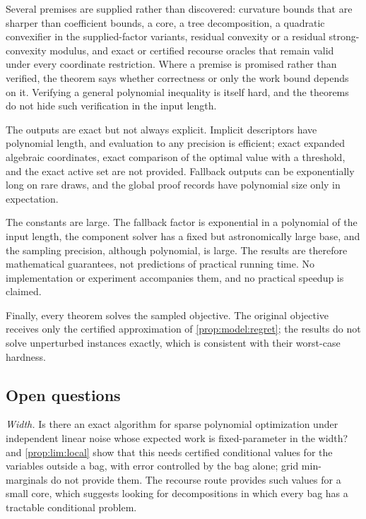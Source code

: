 Several premises are supplied rather than discovered: curvature bounds that
are sharper than coefficient bounds, a core, a tree decomposition, a
quadratic convexifier in the supplied-factor variants, residual convexity or
a residual strong-convexity modulus, and exact or certified recourse oracles
that remain valid under every coordinate restriction. Where a premise is
promised rather than verified, the theorem says whether correctness or only
the work bound depends on it. Verifying a general polynomial inequality is
itself hard, and the theorems do not hide such verification in the input
length.

The outputs are exact but not always explicit. Implicit descriptors have
polynomial length, and evaluation to any precision is efficient; exact
expanded algebraic coordinates, exact comparison of the optimal value with
a threshold, and the exact active set are not provided. Fallback outputs can
be exponentially long on rare draws, and the global proof records have
polynomial size only in expectation.

The constants are large. The fallback factor is exponential in a polynomial
of the input length, the component solver has a fixed but astronomically
large base, and the sampling precision, although polynomial, is large. The
results are therefore mathematical guarantees, not predictions of practical
running time. No implementation or experiment accompanies them, and no
practical speedup is claimed.

Finally, every theorem solves the sampled objective. The original objective
receives only the certified approximation of \cref{prop:model:regret}; the
results do not solve unperturbed instances exactly, which is consistent with
their worst-case hardness.

\subsection{Open questions}\label{sec:disc:open}

\emph{Width.} Is there an exact algorithm for sparse polynomial optimization
under independent linear noise whose expected work is fixed-parameter in the
width?  and \cref{prop:lim:local} show that this needs
certified conditional values for the variables outside a bag, with error
controlled by the bag alone; grid min-marginals do not provide them. The
recourse route provides such values for a small core, which suggests looking
for decompositions in which every bag has a tractable conditional problem.

